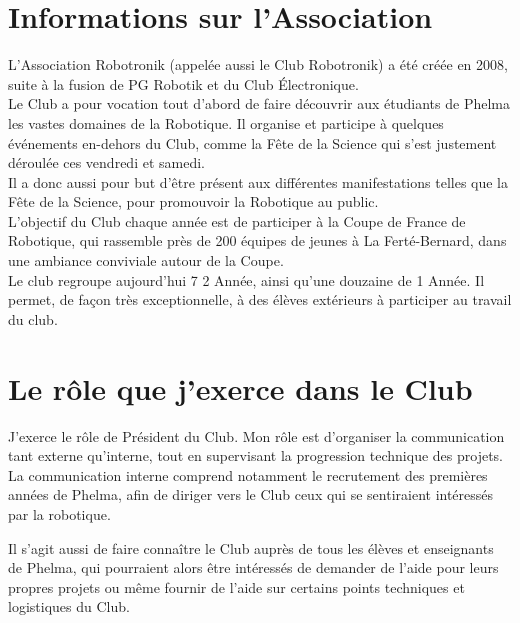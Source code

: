 \documentclass[a4paper,11pt]{article} \usepackage[T1]{fontenc} \usepackage[utf8]{inputenc} \usepackage[francais]{babel}
\date{}
\begin{document}
    \tableofcontents        %
\newpage
{}  %
\part{Informations sur l'Association}
    L'Association Robotronik (appelée aussi le Club Robotronik) a été créée en 2008, suite à la fusion de PG Robotik
    et du Club Électronique.\\

    Le Club a pour vocation tout d'abord de faire découvrir aux étudiants de Phelma les vastes domaines de la Robotique.
    Il organise et participe à quelques événements en-dehors du Club, comme la Fête de la Science qui s'est justement déroulée ces vendredi et samedi.\\

    Il a donc aussi pour but d'être présent aux différentes manifestations telles que la Fête de la Science,
    pour promouvoir la Robotique au public.\\

    L'objectif du Club chaque année est de participer à la Coupe de France de Robotique, qui rassemble près de
    200 équipes de jeunes à La Ferté-Bernard, dans une ambiance conviviale autour de la Coupe.\\

    Le club regroupe aujourd'hui 7 2\iemes{} Année, ainsi qu'une douzaine de 1\ieres{} Année. Il permet, de façon très exceptionnelle, à des élèves extérieurs à participer au travail du club.

\part{Le rôle que j'exerce dans le Club}
    J'exerce le rôle de Président du Club. Mon rôle est d'organiser la communication tant externe qu'interne, tout en supervisant la progression technique des projets.\\

    La communication interne comprend notamment le recrutement des premières années de Phelma, afin de diriger vers le Club ceux qui se sentiraient intéressés par la robotique.

    Il s'agit aussi de faire connaître le Club auprès de tous les élèves et enseignants de Phelma, qui pourraient alors être intéressés de demander de l'aide pour leurs propres projets ou même fournir de l'aide sur certains points techniques et logistiques du Club.
\end{document}
